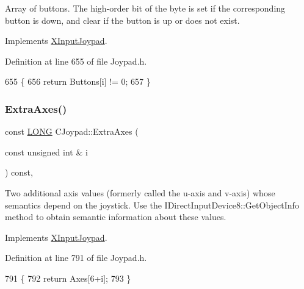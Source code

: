 Array of buttons. The high-\/order bit of the byte is set if the corresponding button is down, and clear if the button is up or does not exist. 

Implements \hyperlink{struct_x_input_joypad_a13cc187aae10747b0376cb1ed3710b5a}{X\+Input\+Joypad}.



Definition at line 655 of file Joypad.\+h.


\begin{DoxyCode}
655                                                    \{
656         \textcolor{keywordflow}{return} Buttons[i] != 0;
657     \}
\end{DoxyCode}
\mbox{\label{class_c_joypad_ac94bd5a534d97f4c82456397e9a01b1c}} 
\subsubsection{\texorpdfstring{Extra\+Axes()}{ExtraAxes()}}
{\footnotesize\ttfamily const \hyperlink{_joypad_8h_a2a3e0cda5f1249bef6db47c5eb8e3813}{L\+O\+NG} C\+Joypad\+::\+Extra\+Axes (\begin{DoxyParamCaption}\item[{const unsigned int \&}]{i }\end{DoxyParamCaption}) const\hspace{0.3cm}{\ttfamily [inline]}, {\ttfamily [virtual]}}

Two additional axis values (formerly called the u-\/axis and v-\/axis) whose semantics depend on the joystick. Use the I\+Direct\+Input\+Device8\+::\+Get\+Object\+Info method to obtain semantic information about these values. 

Implements \hyperlink{struct_x_input_joypad_a074ad76f1e54b559fcee6606049bb6b7}{X\+Input\+Joypad}.



Definition at line 791 of file Joypad.\+h.


\begin{DoxyCode}
791                                                       \{
792         \textcolor{keywordflow}{return} Axes[6+i];
793     \}
\end{DoxyCode}
\mbox{\label{class_c_joypad_aad2ba56e14016ef5cd7120b6097caa8c}} 
